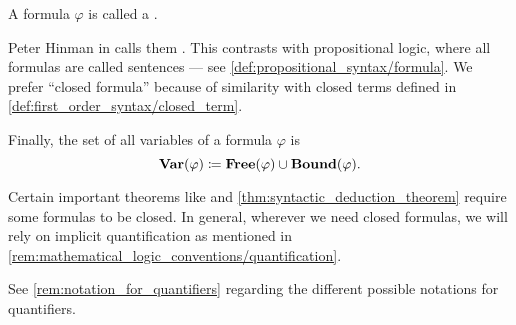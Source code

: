 \begin{definition}
\begin{thmenum}
     A formula \( \varphi \) is called a .

    Peter Hinman in  calls them . This contrasts with propositional logic, where all formulas are called sentences --- see \cref{def:propositional_syntax/formula}. We prefer \enquote{closed formula} because of similarity with closed terms defined in \cref{def:first_order_syntax/closed_term}.

     Finally, the set of all variables of a formula \( \varphi \) is
    \begin{equation*}
      \op*{Var}(\varphi) \coloneqq \op*{Free}(\varphi) \cup \op*{Bound}(\varphi).
    \end{equation*}
  \end{thmenum}
\end{definition}
\begin{comments}
  \item Certain important theorems like  and \cref{thm:syntactic_deduction_theorem} require some formulas to be closed. In general, wherever we need closed formulas, we will rely on implicit quantification as mentioned in \cref{rem:mathematical_logic_conventions/quantification}.

  \item See \cref{rem:notation_for_quantifiers} regarding the different possible notations for quantifiers.
\end{comments}

